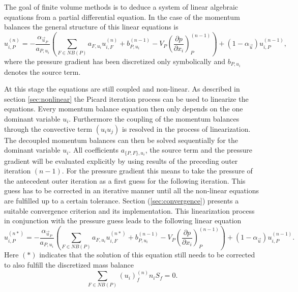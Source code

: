   The goal of finite volume methods is to deduce a system of linear algebraic equations from a partial differential equation. In the case of the momentum balances the general structure of this linear equations is
  \begin{equation}
    \label{eq:linfinal}
    u_{i,P}^{(n)} 
    = 
    - \frac{\alpha_{\vec{u}_P}}{a_{P,u_i}} \left(\sum_{F \in NB(P)} a_{F,u_i} u_{i,F}^{(n)}
    +                                     b_{P,u_i}^{(n-1)} 
    -                                     V_P\left(\frac{\partial p}{\partial x_i}\right)_P^{(n-1)} \right)
    + \left(1 - \alpha_{\vec{u}}\right) u_{i,P}^{(n-1)},
  \end{equation}
  where the pressure gradient has been discretized only symbolically and \(b_{P,u_i}\) denotes the source term. 
  
  At this stage the equations are still coupled and non-linear. As described in section \ref{sec:nonlinear} the Picard iteration process can be used to linearize the equations. Every momentum balance equation then only depends on the one dominant variable \(u_i\). Furthermore the coupling of the momentum balances through the convective term \((u_i u_j)\) is resolved in the process of linearization. The decoupled momentum balances can then be solved sequentially for the dominant variable \(u_i\). All coefficients \(a_{\{P,F\},u_i}\), the source term and the pressure gradient will be evaluated explicitly by using results of the preceding outer iteration \((n-1)\). For the pressure gradient this means to take the pressure of the antecedent outer iteration as a first guess for the following iteration. This guess has to be corrected in an iterative manner until all the non-linear equations are fulfilled up to a certain tolerance. Section (\ref{sec:convergence}) presents a suitable convergence criterion and its implementation. This linearization process in conjunction with the pressure guess leads to the following linear equation 
  \begin{equation}
    \label{eq:nodeinter}
    u_{i,P}^{(n*)} 
    = 
    - \frac{\alpha_{\vec{u}_P}}{a_{P,u_i}} \left(\sum_{F \in NB(P)} a_{F,u_i} u_{i,F}^{(n*)}
    +                                     b_{P,u_i}^{(n-1)} 
    -                                     V_P\left(\frac{\partial p}{\partial x_i}\right)_P^{(n-1)} \right)
    + \left(1 - \alpha_{\vec{u}}\right) u_{i,P}^{(n-1)}.
\end{equation}
Here \((*)\) indicates that the solution of this equation still needs to be corrected to also fulfill the discretized mass balance
  \begin{equation}
    \label{eq:contisemi}
    \sum_{F \in NB(P)} \left(u_i\right)^{(n)}_f n_i S_f = 0.
  \end{equation}

